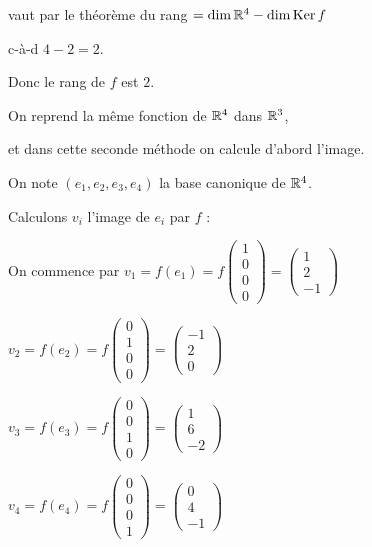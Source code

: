   \change
  vaut par le théorème du rang $ = \dim \mathbb{R}^4 - \dim \mathop{\text{Ker}}\nolimits f$
  
  \change
  c-à-d $4-2 = 2$.
  
  Donc le rang de $f$ est $2$.


\diapo

On reprend la même fonction de $\mathbb{R}^4$ dans $\mathbb{R}^3$,

\change
et dans cette seconde méthode on calcule d'abord l'image. 

\change
On note $(e_1,e_2,e_3,e_4)$ la base canonique de $\mathbb{R}^4$.

\change
Calculons $v_i$ l'image de $e_i$ par $f$ :

On commence par $v_1 = f(e_1) = f\left(\begin{smallmatrix} 1 \\ 0 \\ 0 \\0 \end{smallmatrix}\right) 
= \left(\begin{smallmatrix} 1 \\ 2 \\ -1 \end{smallmatrix}\right)$

\change
$v_2 = f(e_2) = f\left(\begin{smallmatrix} 0 \\ 1 \\ 0 \\ 0\end{smallmatrix}\right) 
= \left(\begin{smallmatrix} -1 \\ 2 \\ 0 \end{smallmatrix}\right)$

\change
$v_3 = f(e_3) = f\left(\begin{smallmatrix} 0 \\ 0 \\ 1 \\  0\end{smallmatrix}\right)
= \left(\begin{smallmatrix} 1 \\ 6 \\ -2 \end{smallmatrix}\right)$

\change
$v_4 = f(e_4) = f\left(\begin{smallmatrix} 0 \\ 0 \\ 0 \\1 \end{smallmatrix}\right) 
= \left(\begin{smallmatrix} 0 \\ 4 \\ -1 \end{smallmatrix}\right)$

